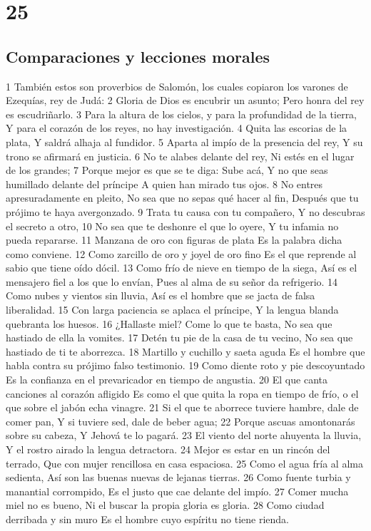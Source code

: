 \chapter{25}

\section*{Comparaciones y lecciones morales}

1 También estos son proverbios de Salomón, los cuales copiaron los varones de Ezequías, rey de Judá: 
2 Gloria de Dios es encubrir un asunto;
Pero honra del rey es escudriñarlo.
3 Para la altura de los cielos, y para la profundidad de la tierra,
Y para el corazón de los reyes, no hay investigación.
4 Quita las escorias de la plata,
Y saldrá alhaja al fundidor.
5 Aparta al impío de la presencia del rey,
Y su trono se afirmará en justicia.
6 No te alabes delante del rey,
Ni estés en el lugar de los grandes;
7 Porque mejor es que se te diga: Sube acá,
Y no que seas humillado delante del príncipe
A quien han mirado tus ojos. 
8 No entres apresuradamente en pleito,
No sea que no sepas qué hacer al fin,
Después que tu prójimo te haya avergonzado.
9 Trata tu causa con tu compañero,
Y no descubras el secreto a otro,
10 No sea que te deshonre el que lo oyere,
Y tu infamia no pueda repararse.
11 Manzana de oro con figuras de plata
Es la palabra dicha como conviene.
12 Como zarcillo de oro y joyel de oro fino
Es el que reprende al sabio que tiene oído dócil.
13 Como frío de nieve en tiempo de la siega,
Así es el mensajero fiel a los que lo envían,
Pues al alma de su señor da refrigerio.
14 Como nubes y vientos sin lluvia,
Así es el hombre que se jacta de falsa liberalidad.
15 Con larga paciencia se aplaca el príncipe,
Y la lengua blanda quebranta los huesos.
16 ¿Hallaste miel? Come lo que te basta,
No sea que hastiado de ella la vomites.
17 Detén tu pie de la casa de tu vecino,
No sea que hastiado de ti te aborrezca.
18 Martillo y cuchillo y saeta aguda
Es el hombre que habla contra su prójimo falso testimonio.
19 Como diente roto y pie descoyuntado
Es la confianza en el prevaricador en tiempo de angustia.
20 El que canta canciones al corazón afligido
Es como el que quita la ropa en tiempo de frío, o el que sobre el jabón echa vinagre.
21 Si el que te aborrece tuviere hambre, dale de comer pan,
Y si tuviere sed, dale de beber agua;
22 Porque ascuas amontonarás sobre su cabeza, 
Y Jehová te lo pagará.
23 El viento del norte ahuyenta la lluvia,
Y el rostro airado la lengua detractora.
24 Mejor es estar en un rincón del terrado,
Que con mujer rencillosa en casa espaciosa.
25 Como el agua fría al alma sedienta,
Así son las buenas nuevas de lejanas tierras.
26 Como fuente turbia y manantial corrompido,
Es el justo que cae delante del impío.
27 Comer mucha miel no es bueno,
Ni el buscar la propia gloria es gloria.
28 Como ciudad derribada y sin muro
Es el hombre cuyo espíritu no tiene rienda.

